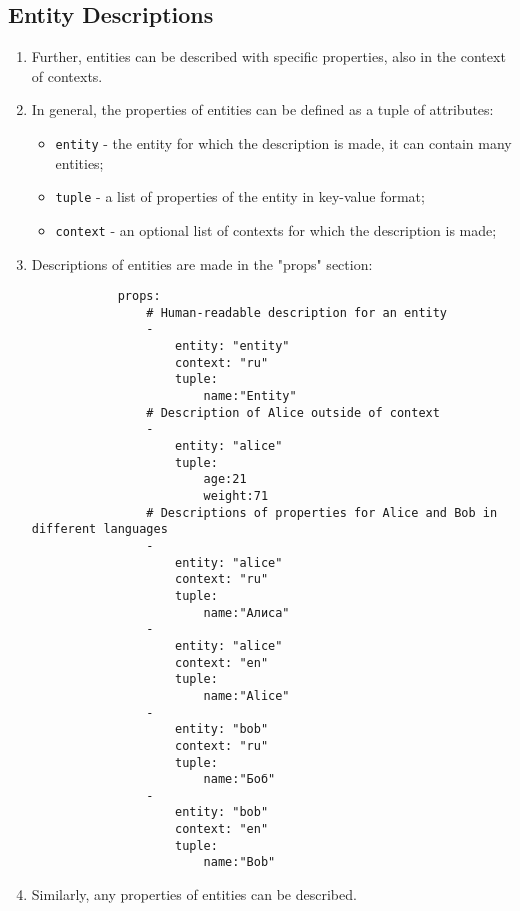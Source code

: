 \documentclass[final]{article}
\begin{document}
    \subsection{Entity Descriptions}
        \begin{enumerate}

            \item Further, entities can be described with specific properties, also in the context of contexts.

            \item In general, the properties of entities can be defined as a tuple of attributes:

            \begin{itemize}
                \item \texttt{entity} - the entity for which the description is made, it can contain many entities;
                \item \texttt{tuple} - a list of properties of the entity in key-value format;
                \item \texttt{context} - an optional list of contexts for which the description is made;
            \end{itemize}

            \item Descriptions of entities are made in the "props" section:

            \begin{verbatim}
            props:
                # Human-readable description for an entity
                -
                    entity: "entity"
                    context: "ru"
                    tuple:
                        name:"Entity"
                # Description of Alice outside of context
                -
                    entity: "alice"
                    tuple:
                        age:21
                        weight:71
                # Descriptions of properties for Alice and Bob in different languages
                -
                    entity: "alice"
                    context: "ru"
                    tuple:
                        name:"Алиса"
                -
                    entity: "alice"
                    context: "en"
                    tuple:
                        name:"Alice"
                -
                    entity: "bob"
                    context: "ru"
                    tuple:
                        name:"Боб"
                -
                    entity: "bob"
                    context: "en"
                    tuple:
                        name:"Bob"

            \end{verbatim}

            \item Similarly, any properties of entities can be described.

        \end{enumerate}
\end{document}
